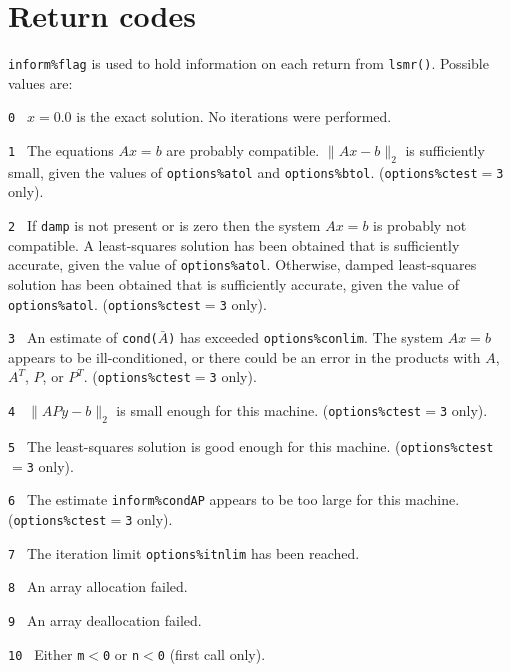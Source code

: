 
\section{Return codes} \label{LSMR:errors}

{\tt inform\%flag} is used to hold
   information on each return from {\tt lsmr()}. 
Possible values are:
\begin{description}
\item{\tt 0 }  $x = 0.0$  is the exact solution.
               No iterations were performed.
\item{\tt 1 }  The equations $Ax = b$ are probably compatible.
               $\|Ax - b\|_2$ is sufficiently small, given the
               values of {\tt options\%atol} and {\tt options\%btol}. 
               ({\tt options\%ctest}$ = ${\tt 3} only). 
\item{\tt 2 }  If {\tt damp} is not present or is zero then the system $Ax = b$
               is probably not compatible.  A least-squares solution has been
               obtained that is sufficiently accurate, given the value of
               {\tt options\%atol}.  
               Otherwise, damped least-squares solution has been obtained that
               is sufficiently accurate, given the value of {\tt options\%atol}.
               ({\tt options\%ctest}$ = ${\tt 3} only). 
\item{\tt 3 }  An estimate of {\tt cond($\bar{A}$)} has exceeded
               {\tt options\%conlim}. The system $Ax = b$ appears to be
               ill-conditioned, or there could be an error in the products 
               with $A$, $A^T$, $P$, or $P^T$. ({\tt options\%ctest}$ = ${\tt 3}
               only). 
\item{\tt 4 }  $\|APy - b \|_2$ is small enough for this machine.
               ({\tt options\%ctest}$ = ${\tt 3} only). 
\item{\tt 5 }  The least-squares solution is good enough for this
               machine. ({\tt options\%ctest}$ = ${\tt 3} only). 
\item{\tt 6 }  The estimate {\tt inform\%condAP} appears to be too large 
               for this machine.         
               ({\tt options\%ctest}$ = ${\tt 3} only). 
\item{\tt 7 }  The iteration limit {\tt options\%itnlim} has been reached. 
\item{\tt 8 }  An array allocation failed.
\item{\tt 9 }  An array deallocation failed.
\item{\tt 10 } Either  {\tt m$<$0} or {\tt n$<$0} (first call only).

\end{description}

